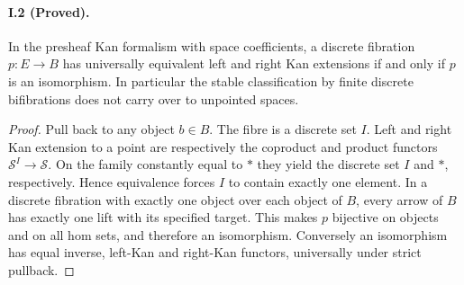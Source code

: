 \paragraph{I.2 (Proved).}
In the presheaf Kan formalism with space coefficients, a discrete
fibration $p:E\to B$ has universally equivalent left and right Kan
extensions if and only if $p$ is an isomorphism. In particular the
stable classification by finite discrete bifibrations does not carry
over to unpointed spaces.
\begin{proof}
Pull back to any object $b\in B$. The fibre is a discrete set $I$.
Left and right Kan extension to a point are respectively the
coproduct and product functors $\mathcal S^I\to\mathcal S$.
On the family constantly equal to $*$ they yield the discrete set
$I$ and $*$, respectively. Hence equivalence forces $I$ to contain
exactly one element. In a discrete fibration with exactly one
object over each object of $B$, every arrow of $B$ has exactly one
lift with its specified target. This makes $p$ bijective on objects
and on all hom sets, and therefore an isomorphism. Conversely an
isomorphism has equal inverse, left-Kan and right-Kan functors,
universally under strict pullback.
\end{proof}


